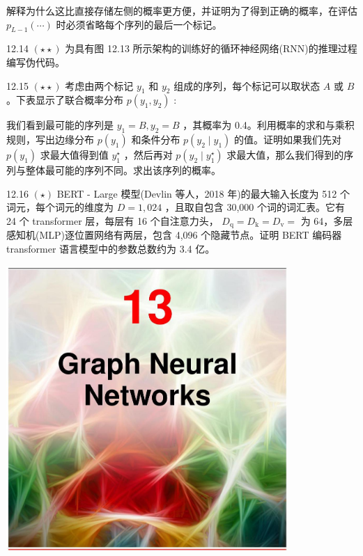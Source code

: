 \documentclass[10pt]{report}
\begin{document}
解释为什么这比直接存储左侧的概率更方便，并证明为了得到正确的概率，在评估 \({p}_{L - 1}\left( \cdots \right)\) 时必须省略每个序列的最后一个标记。

12.14 \(\left( {\star  \star  }\right)\) 为具有图 12.13 所示架构的训练好的循环神经网络(RNN)的推理过程编写伪代码。

12.15 \(\left( {\star  \star  }\right)\) 考虑由两个标记 \({y}_{1}\) 和 \({y}_{2}\) 组成的序列，每个标记可以取状态 \(A\) 或 \(B\) 。下表显示了联合概率分布 \(p\left( {{y}_{1},{y}_{2}}\right)\) :

\begin{center}
\end{center}

我们看到最可能的序列是 \({y}_{1} = B,{y}_{2} = B\) ，其概率为 0.4。利用概率的求和与乘积规则，写出边缘分布 \(p\left( {y}_{1}\right)\) 和条件分布 \(p\left( {{y}_{2} \mid  {y}_{1}}\right)\) 的值。证明如果我们先对 \(p\left( {y}_{1}\right)\) 求最大值得到值 \({y}_{1}^{ \star  }\) ，然后再对 \(p\left( {{y}_{2} \mid  {y}_{1}^{ \star  }}\right)\) 求最大值，那么我们得到的序列与整体最可能的序列不同。求出该序列的概率。

12.16 \(\left( \star \right)\) BERT - Large 模型(Devlin 等人，2018 年)的最大输入长度为 512 个词元，每个词元的维度为 \(D = 1,{024}\) ，且取自包含 30,000 个词的词汇表。它有 24 个 transformer 层，每层有 16 个自注意力头， \({D}_{\mathrm{q}} = {D}_{\mathrm{k}} = {D}_{\mathrm{v}} =\) 为 64，多层感知机(MLP)逐位置网络有两层，包含 4,096 个隐藏节点。证明 BERT 编码器 transformer 语言模型中的参数总数约为 3.4 亿。

\begin{center}
\includegraphics[max width=0.8\textwidth]{images/0194e279-9b28-703a-88f4-c3ac21e2010d_426_474_348_1074_1089_0.jpg}
\end{center}
\hspace*{3em} 
\end{document}

